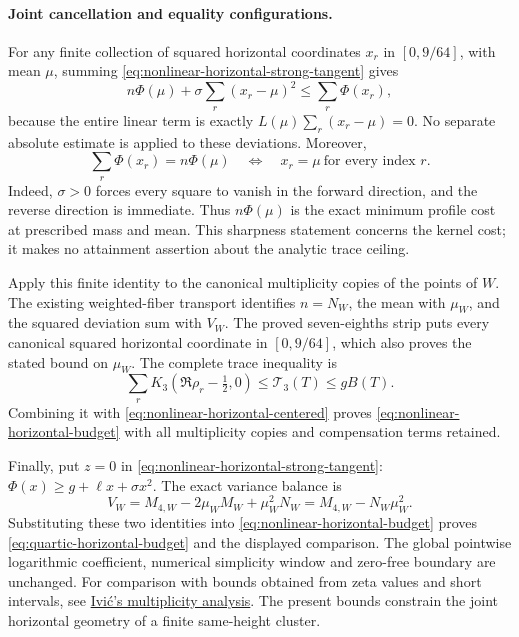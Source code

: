 \paragraph{Joint cancellation and equality configurations.}
For any finite collection of squared horizontal coordinates \(x_r\)
in \([0,9/64]\), with mean \(\mu\), summing
\eqref{eq:nonlinear-horizontal-strong-tangent} gives
\begin{equation}
 n\Phi(\mu)+\sigma\sum_r(x_r-\mu)^2\le\sum_r\Phi(x_r),
 \label{eq:nonlinear-horizontal-centered}
\end{equation}
because the entire linear term is exactly
\(L(\mu)\sum_r(x_r-\mu)=0\).  No separate absolute estimate is applied
to these deviations.  Moreover,
\[
 \sum_r\Phi(x_r)=n\Phi(\mu)
 \quad\Longleftrightarrow\quad
 x_r=\mu\ \text{for every index }r.
\]
Indeed, \(\sigma>0\) forces every square to vanish in the forward
direction, and the reverse direction is immediate.
Thus \(n\Phi(\mu)\) is the exact minimum profile cost at prescribed
mass and mean.  This sharpness statement concerns the kernel cost;
it makes no attainment assertion about the analytic trace ceiling.

Apply this finite identity to the canonical multiplicity copies of the
points of \(W\).  The existing weighted-fiber transport identifies
\(n=N_W\), the mean with \(\mu_W\), and the squared deviation sum
with \(V_W\).  The proved seven-eighths strip puts every canonical
squared horizontal coordinate in \([0,9/64]\), which also proves the
stated bound on \(\mu_W\).  The complete trace inequality is
\[
 \sum_r K_3(\Re\rho_r-\tfrac12,0)
 \le\mathcal T_3(T)\le gB(T).
\]
Combining it with \eqref{eq:nonlinear-horizontal-centered} proves
\eqref{eq:nonlinear-horizontal-budget} with all multiplicity copies
and compensation terms retained.

Finally, put \(z=0\) in \eqref{eq:nonlinear-horizontal-strong-tangent}:
\(\Phi(x)\ge g+\ell x+\sigma x^2\).  The exact variance balance is
\[
 V_W=M_{4,W}-2\mu_WM_W+\mu_W^2N_W
     =M_{4,W}-N_W\mu_W^2.
\]
Substituting these two identities into
\eqref{eq:nonlinear-horizontal-budget} proves
\eqref{eq:quartic-horizontal-budget} and the displayed comparison.
The global pointwise logarithmic coefficient, numerical simplicity
window and zero-free boundary are unchanged.
For comparison with bounds obtained from zeta values and short
intervals, see
\href{https://arxiv.org/abs/1706.08268}{Ivi\'c's multiplicity analysis}.
The present bounds constrain the joint horizontal geometry of a finite
same-height cluster.

